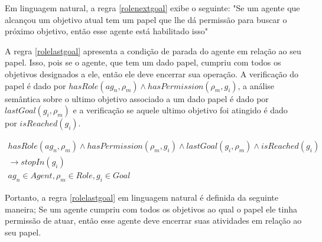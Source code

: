 Em linguagem natural, a regra \ref{rolenextgoal} exibe o seguinte: "Se um agente que alcançou um objetivo atual tem um papel que lhe dá permissão para 
buscar o próximo objetivo, então esse agente está habilitado isso"

A regra \ref{rolelastgoal} apresenta a condição de parada do agente em relação ao seu papel. Isso, pois se o agente, que tem um dado papel,
cumpriu com todos os objetivos designados a ele, então ele deve encerrar sua operação. A verificação do papel é dado por $hasRole(ag_n,\rho_m) \wedge
 hasPermission(\rho_m,g_i)$, a análise semântica sobre o ultimo objetivo associado a um dado papel é dado por $lastGoal(g_i,\rho_m)$ e a verificação 
 se aquele ultimo objetivo foi atingido é dado por $isReached(g_i)$. 

\begin{eqnarray}\label{rolelastgoal}
	hasRole(ag_n,\rho_m) \wedge hasPermission(\rho_m,g_i) \wedge lastGoal(g_i,\rho_m) \wedge isReached(g_i) \nonumber \\
	\to stopIn(g_i) \nonumber \\
    ag_n \in Agent, \rho_m \in Role, g_i \in Goal
\end{eqnarray}

Portanto, a regra \ref{rolelastgoal} em linguagem natural é definida da seguinte maneira; Se um agente cumpriu com todos os objetivos ao qual o papel 
ele tinha permissão de atuar, então esse agente deve encerrar suas atividades em relação ao seu papel.